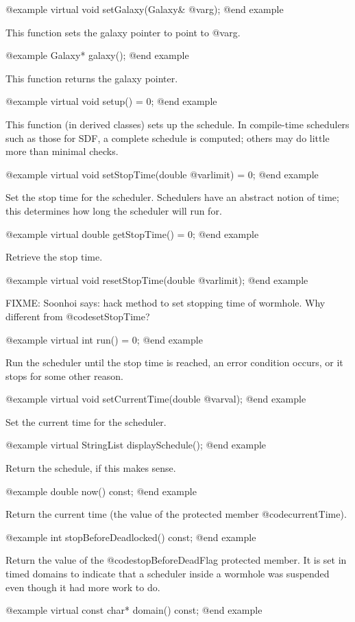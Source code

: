 @example
virtual void setGalaxy(Galaxy& @var{g});
@end example

This function sets the galaxy pointer to point to @var{g}.

@example
Galaxy* galaxy();
@end example

This function returns the galaxy pointer.

@example
virtual void setup() = 0;
@end example

This function (in derived classes) sets up the schedule.  In
compile-time schedulers such as those for SDF, a complete schedule is
computed; others may do little more than minimal checks.

@example
virtual void setStopTime(double @var{limit}) = 0;
@end example

Set the stop time for the scheduler.  Schedulers have an abstract
notion of time; this determines how long the scheduler will run for.

@example
virtual double getStopTime() = 0;
@end example

Retrieve the stop time.

@example
virtual void resetStopTime(double @var{limit});
@end example

FIXME: Soonhoi says: hack method to set stopping time of wormhole.
Why different from @code{setStopTime}?

@example
virtual int run() = 0;
@end example

Run the scheduler until the stop time is reached, an error condition
occurs, or it stops for some other reason.

@example
virtual void setCurrentTime(double @var{val});
@end example

Set the current time for the scheduler.

@example
virtual StringList displaySchedule();
@end example

Return the schedule, if this makes sense.

@example
double now() const;
@end example

Return the current time (the value of the protected member
@code{currentTime}).

@example
int stopBeforeDeadlocked() const;
@end example

Return the value of the @code{stopBeforeDeadFlag} protected member.
It is set in timed domains to indicate that a scheduler inside a
wormhole was suspended even though it had more work to do.

@example
virtual const char* domain() const;
@end example


